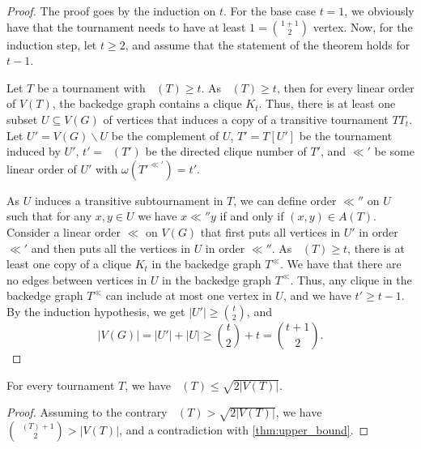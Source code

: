 \documentclass[a4paper,USenglish,cleveref,autoref,thm-restate,pdfa]{lipics-v2021}
\let\setminus\smallsetminus
\newcommand{\norm}[1]{\left|#1\right|}
\newcommand{\ora}[1]{\overrightarrow{#1}}
\DeclareMathOperator{\diomega}{\ora \omega}
\begin{document}
\begin{proof}
    The proof goes by the induction on $t$.
    For the base case $t=1$, we obviously have that the tournament needs to have at least $1={{1+1} \choose 2}$ vertex.
    Now, for the induction step, let $t\ge2$, and assume that the statement of the theorem holds for $t-1$.

    Let $T$ be a tournament with $\diomega(T) \ge t$.
    As $\diomega(T) \ge t$, then for every linear order of $V(T)$, the backedge graph contains a clique $K_t$.
    Thus, there is at least one subset $U \subseteq V(G)$ of vertices that induces a copy of a transitive tournament $TT_t$.
    Let $U' = V(G)\setminus U$ be the complement of $U$, $T' = T[U']$ be the tournament induced by $U'$, $t' = \diomega(T')$ be the directed clique number of $T'$, and $\ll'$ be some linear order of $U'$ with $\omega(T'^{\ll'})=t'$.

    As $U$ induces a transitive subtournament in $T$, we can define order $\ll''$ on $U$ such that for any $x,y \in U$ we have $x \ll'' y$ if and only if $(x,y) \in A(T)$.
    Consider a linear order $\ll$ on $V(G)$ that first puts all vertices in $U'$ in order $\ll'$ and then puts all the vertices in $U$ in order $\ll''$.
    As $\diomega(T) \ge t$, there is at least one copy of a clique $K_t$ in the backedge graph $T^\ll$.
    We have that there are no edges between vertices in $U$ in the backedge graph $T^\ll$.
    Thus, any clique in the backedge graph $T^\ll$ can include at most one vertex in $U$, and we have $t' \ge t-1$.
    By the induction hypothesis, we get $\norm{U'} \ge {t\choose2}$, and
    \[
        \norm{V(G)} = \norm{U'} + \norm{U} \ge {t\choose2} + t = {{t+1}\choose2}\text{.}
    \]
\end{proof}

\begin{corollary}\label{cor:upper_bound}
    For every tournament $T$, we have $\diomega(T) \le \sqrt{2\norm{V(T)}}$.
\end{corollary}
\begin{proof}
    Assuming to the contrary \(\diomega(T) > \sqrt{2\norm{V(T)}}\), we have \({{\diomega(T)+1}\choose{2}} > \norm{V(T)}\), and a contradiction with \cref{thm:upper_bound}.
\end{proof}
    

\end{document}
